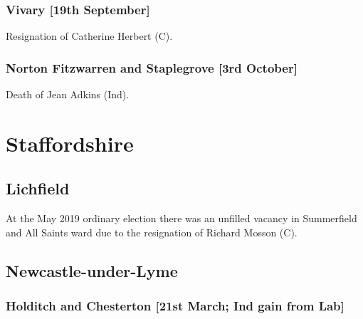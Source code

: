 \documentclass[a4paper,openany]{book}
\begin{document}
\begin{resultsiii}
\subsubsection*{Vivary \hspace*{\fill}\nolinebreak[1]%
	\enspace\hspace*{\fill}
	[19th September]}


Resignation of Catherine Herbert (C).

\subsubsection*{Norton Fitzwarren and Staplegrove \hspace*{\fill}\nolinebreak[1]%
	\enspace\hspace*{\fill}
	[3rd October]}


Death of Jean Adkins (Ind).

\section{Staffordshire}

\subsection*{Lichfield}

At the May 2019 ordinary election there was an unfilled vacancy in Summerfield and All Saints ward due to the resignation of Richard Mosson (C).

\subsection*{Newcastle-under-Lyme}

\subsubsection*{Holditch and Chesterton \hspace*{\fill}\nolinebreak[1]%
	\enspace\hspace*{\fill}
	[21st March; Ind gain from Lab]}


\end{resultsiii}
\end{document}
